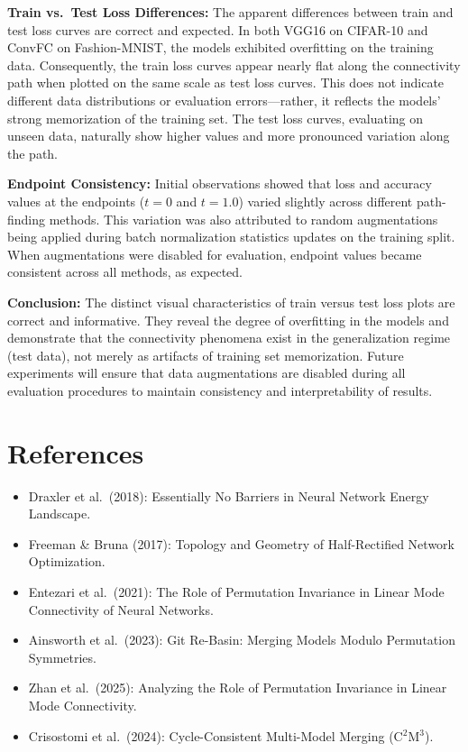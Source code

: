 \documentclass[11pt,a4paper]{article}
\begin{document}
\textbf{Train vs.\ Test Loss Differences:} The apparent differences between train and test loss curves are correct and expected. In both VGG16 on CIFAR-10 and ConvFC on Fashion-MNIST, the models exhibited overfitting on the training data. Consequently, the train loss curves appear nearly flat along the connectivity path when plotted on the same scale as test loss curves. This does not indicate different data distributions or evaluation errors---rather, it reflects the models' strong memorization of the training set. The test loss curves, evaluating on unseen data, naturally show higher values and more pronounced variation along the path.

\textbf{Endpoint Consistency:} Initial observations showed that loss and accuracy values at the endpoints ($t=0$ and $t=1.0$) varied slightly across different path-finding methods. This variation was also attributed to random augmentations being applied during batch normalization statistics updates on the training split. When augmentations were disabled for evaluation, endpoint values became consistent across all methods, as expected.

\textbf{Conclusion:} The distinct visual characteristics of train versus test loss plots are correct and informative. They reveal the degree of overfitting in the models and demonstrate that the connectivity phenomena exist in the generalization regime (test data), not merely as artifacts of training set memorization. Future experiments will ensure that data augmentations are disabled during all evaluation procedures to maintain consistency and interpretability of results.


\section{References}
\begin{itemize}
    \item Draxler et al.\ (2018): Essentially No Barriers in Neural Network Energy Landscape.
    \item Freeman \& Bruna (2017): Topology and Geometry of Half-Rectified Network Optimization.
    \item Entezari et al.\ (2021): The Role of Permutation Invariance in Linear Mode Connectivity of Neural Networks.
    \item Ainsworth et al.\ (2023): Git Re-Basin: Merging Models Modulo Permutation Symmetries.
    \item Zhan et al.\ (2025): Analyzing the Role of Permutation Invariance in Linear Mode Connectivity.
    \item Crisostomi et al.\ (2024): Cycle-Consistent Multi-Model Merging (C$^2$M$^3$).
\end{itemize}
\end{document}

